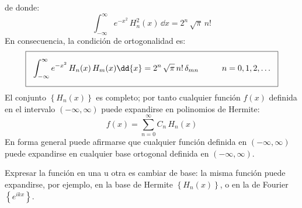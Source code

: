 de donde:
\[ \int_{-\infty}^{\infty} e^{-x^{2}} \, H_{n}^{2} (x) \, \dd{x} = 2^{n} \, \sqrt{\pi} \, n! \]
En consecuencia, la condición de ortogonalidad es:
\begin{equation}
\setlength{\fboxsep}{3\fboxsep}\boxed{ \int_{-\infty}^{\infty} e^{-x^{2}} \, H_{n} (x) \, H_{m} (x) \dd{x} = 2^{n} \, \sqrt{\pi} \, n! \, \delta_{m n} \hspace{1cm} n = 0, 1, 2, \ldots }
\end{equation}
El conjunto $\left\{ H_{n }(x) \right\}$ es completo; por tanto cualquier función $f(x)$ definida en el intervalo $(-\infty, \infty)$ puede expandirse en polinomios de Hermite:
\[ f(x) = \sum_{n=0}^{\infty} C_{n} \, H_{n} (x) \]
En forma general puede afirmarse que cualquier función definida en $(-\infty, \infty)$ puede expandirse en cualquier base ortogonal definida en $(-\infty, \infty)$.
\par
Expresar la función en una u otra es cambiar de base: la misma función puede expandirse, por ejemplo, en la base de Hermite $\left\{ H_{n }(x) \right\}$, o en la de Fourier $\left\{ e^{i k x} \right\}$.
